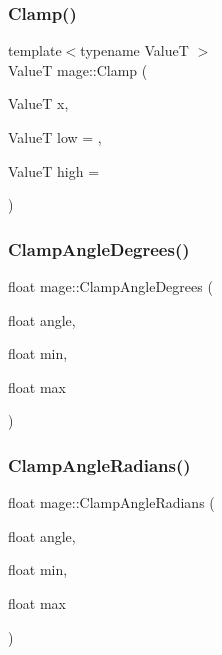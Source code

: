 \subsubsection{\texorpdfstring{Clamp()}{Clamp()}}
{\footnotesize\ttfamily template$<$typename ValueT $>$ \\
ValueT mage\+::\+Clamp (\begin{DoxyParamCaption}\item[{ValueT}]{x,  }\item[{ValueT}]{low = {},  }\item[{ValueT}]{high = {} }\end{DoxyParamCaption})}

\hypertarget{namespacemage_a25d1197c5d3c86cc5d15e8225f796ac3}{}\label{namespacemage_a25d1197c5d3c86cc5d15e8225f796ac3} 
\subsubsection{\texorpdfstring{Clamp\+Angle\+Degrees()}{ClampAngleDegrees()}}
{\footnotesize\ttfamily float mage\+::\+Clamp\+Angle\+Degrees (\begin{DoxyParamCaption}\item[{float}]{angle,  }\item[{float}]{min,  }\item[{float}]{max }\end{DoxyParamCaption})}

\hypertarget{namespacemage_ad538eb214c63b04ec6045e60791b814b}{}\label{namespacemage_ad538eb214c63b04ec6045e60791b814b} 
\subsubsection{\texorpdfstring{Clamp\+Angle\+Radians()}{ClampAngleRadians()}}
{\footnotesize\ttfamily float mage\+::\+Clamp\+Angle\+Radians (\begin{DoxyParamCaption}\item[{float}]{angle,  }\item[{float}]{min,  }\item[{float}]{max }\end{DoxyParamCaption})}

\hypertarget{namespacemage_a78e4a1d3c21d6eb8657bfa0a9631d6ee}{}\label{namespacemage_a78e4a1d3c21d6eb8657bfa0a9631d6ee} 
